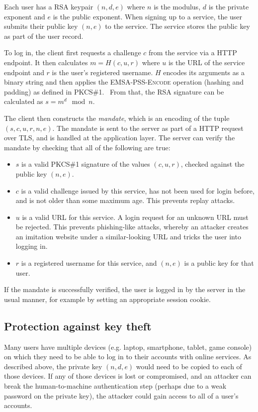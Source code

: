 Each user has a RSA keypair $(n, d, e)$ where $n$ is the modulus, $d$ is the private exponent and
$e$ is the public exponent. When signing up to a service, the user submits their public key
$(n, e)$ to the service. The service stores the public key as part of the user record.

To log in, the client first requests a challenge $c$ from the service via a HTTP endpoint. It then
calculates $m = H(c, u, r)$ where $u$ is the URL of the service endpoint and $r$ is the user's
registered username. $H$ encodes its arguments as a binary string and then applies the
\textsc{EMSA-PSS-Encode} operation (hashing and padding) as defined in PKCS\#1.~\cite{PKCS1} From
that, the RSA signature can be calculated as $s = m^d \mod n$.

The client then constructs the \emph{mandate}, which is an encoding of the tuple
$(s, c, u, r, n, e)$. The mandate is sent to the server as part of a HTTP request over TLS, and is
handled at the application layer. The server can verify the mandate by checking that all of the
following are true:
\begin{itemize}
\item $s$ is a valid PKCS\#1 signature of the values $(c, u, r)$, checked against the public key
$(n, e)$.
\item $c$ is a valid challenge issued by this service, has not been used for login before, and is
not older than some maximum age. This prevents replay attacks.
\item $u$ is a valid URL for this service. A login request for an unknown URL must be rejected.
This prevents phishing-like attacks, whereby an attacker creates an imitation website under a
similar-looking URL and tricks the user into logging in.
\item $r$ is a registered username for this service, and $(n, e)$ is a public key for that user.
\end{itemize}
If the mandate is successfully verified, the user is logged in by the server in the usual manner,
for example by setting an appropriate session cookie.

\subsection{Protection against key theft}\label{sec:revocation}

Many users have multiple devices (e.g. laptop, smartphone, tablet, game console) on which they need
to be able to log in to their accounts with online services. As described above, the private key
$(n, d, e)$ would need to be copied to each of those devices. If any of those devices is lost or
compromised, and an attacker can break the human-to-machine authentication step (perhaps due to a
weak password on the private key), the attacker could gain access to all of a user's accounts.

